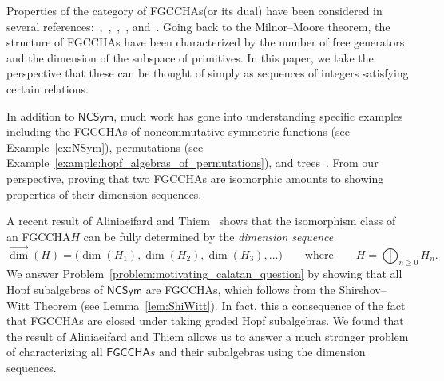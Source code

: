 \documentclass[11pt]{amsart}
\theoremstyle{definition}
\numberwithin{equation}{section}
\newcommand{\FGCCHA}{\textsf{FGCCHA}\xspace}
\newcommand{\FGCCHAs}{\textsf{FGCCHA}s\xspace}
\newcommand{\vecdim}{\overrightarrow{\dim}}
\newcommand{\NCSym}{\mathsf{NCSym}}
\newcommand{\lucas}[1]{\todo[size=\tiny,color=red!50]{#1 \\ \hfill --- Lucas}}
\begin{document}
Properties of the category of \FGCCHAs (or its dual) have been considered in several references:~\cite{MM65},~\cite{Block85},~\cite{Reutenauer-FreeLieAlgebras},~\cite{AT22}, and~\cite{FP24}.  
Going back to the Milnor--Moore theorem, the structure of \FGCCHAs have been characterized by the number of free generators and the dimension of the subspace of primitives.  
In this paper, we take the perspective that these can be thought of simply as sequences of integers satisfying certain relations.  

In addition to $\NCSym$, much work has gone into understanding specific examples including the \FGCCHAs of noncommutative symmetric functions (see Example~\ref{ex:NSym}), permutations (see Example~\ref{example:hopf_algebras_of_permutations}), and trees~\cite{AS05cc, GL09}.  
From our perspective, proving that two \FGCCHAs are isomorphic amounts to showing properties of their dimension sequences.  

%

A recent result of Aliniaeifard and Thiem~\cite{AT20} shows that the isomorphism class of an \FGCCHA $H$ can be fully determined by the \emph{dimension sequence}
\[
\vecdim(H) = \big( \dim(H_{1}), \dim(H_{2}), \dim(H_{3}), \ldots \big)
\qquad\text{where}\qquad
H = \bigoplus_{n \ge 0} H_{n}.
\]
We answer Problem~\ref{problem:motivating_calatan_question} by showing that all Hopf subalgebras of $\NCSym$ are \FGCCHAs, which follows from the Shirshov--Witt Theorem (see Lemma~\ref{lem:ShiWitt}).  
In fact, this a consequence of the fact that \FGCCHAs are closed under taking graded Hopf subalgebras.  
We found that the result of Aliniaeifard and Thiem allows us to answer a much stronger problem of characterizing all $\FGCCHAs$ and their subalgebras using the dimension sequences.  

\end{document}
